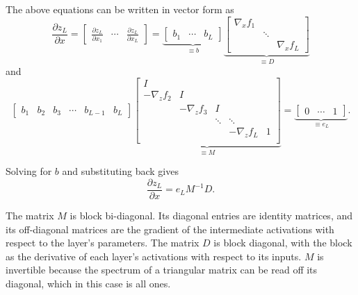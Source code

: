 \documentclass{article}
\begin{document}
The above equations can be written in vector form as
\begin{equation}
    \frac{\partial z_L}{\partial x} =
    \begin{bmatrix}
        \frac{\partial z_L}{\partial x_1} & \cdots & \frac{\partial z_L}{\partial x_L}
    \end{bmatrix}
    =
    \underbrace{\begin{bmatrix}
            b_1 & \cdots & b_L
        \end{bmatrix}
    }_{\equiv b}
    \underbrace{\begin{bmatrix}
            \nabla_x f_1 &                       \\
                         & \ddots                \\
                         &        & \nabla_x f_L
        \end{bmatrix}
    }_{\equiv D}
\end{equation}
and
\begin{equation}
    \begin{bmatrix}
        b_1 & b_2 & b_3 & \cdots & b_{L-1} & b_L
    \end{bmatrix}
    \underbrace{
        \begin{bmatrix}
            I                                                          \\
            -\nabla_z f_2 & I                                          \\
                          & -\nabla_z f_3 & I                          \\
                          &               & \ddots & \ddots            \\
                          &               &        & -\nabla_z f_L & 1 \\
        \end{bmatrix}
    }_{\equiv M}
    =
    \underbrace{\begin{bmatrix}
            0 & \cdots & 1
        \end{bmatrix}
    }_{\equiv e_L}.
\end{equation}

Solving for $b$ and substituting back gives
\begin{equation}
    \frac{\partial z_L}{\partial x} =  e_L M^{-1} D.
\end{equation}

The matrix $M$ is block bi-diagonal. Its diagonal entries are identity
matrices, and its off-diagonal matrices are the gradient of the intermediate
activations with respect to the layer's parameters. The matrix $D$ is block
diagonal, with the block as the derivative of each layer's activations with
respect to its inputs. $M$ is invertible because the spectrum of a triangular
matrix can be read off its diagonal, which in this case is all ones.
\end{document}
